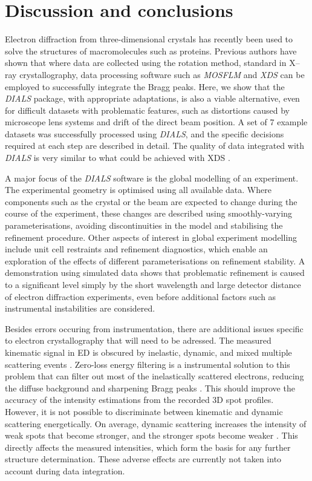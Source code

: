 \documentclass[preprint]{iucr}
\newcommand{\dials}{\emph{DIALS}\xspace}
\newcommand{\xds}{\emph{XDS}\xspace}
\newcommand{\mosflm}{\emph{MOSFLM}\xspace}
\begin{document}
\section{Discussion and conclusions}

Electron diffraction from three-dimensional crystals has recently been used to
solve the structures of macromolecules such as proteins. Previous authors have
shown that where data are collected using the rotation method, standard in
X--ray crystallography, data processing software such as \mosflm and
\xds can be employed to successfully integrate the Bragg peaks. Here, we show
that the \dials package, with appropriate adaptations, is also a viable
alternative, even for difficult datasets with problematic features, such as
distortions caused by microscope lens systems and drift of the direct beam
position. A set of 7 example datasets was successfully processed using \dials,
and the specific decisions required at each step are described in detail. The
quality of data integrated with \dials is very similar to what could be achieved
with XDS \cite{Clabbers2017}.

A major focus of the \dials software is the global modelling of an experiment.
The experimental geometry is optimised using all available data. Where
components such as the crystal or the beam are expected to change during the
course of the experiment, these changes are described using smoothly-varying
parameterisations, avoiding discontinuities in the model and stabilising the
refinement procedure. Other aspects of interest in global experiment modelling
include unit cell restraints and refinement diagnostics, which enable an
exploration of the effects of different parameterisations on refinement
stability. A demonstration using simulated data shows that problematic
refinement is caused to a significant level simply by the short wavelength and
large detector distance of electron diffraction experiments, even before
additional factors such as instrumental instabilities are considered.

Besides errors occuring from instrumentation, there are additional issues
specific to electron crystallography that will need to be adressed.
The measured kinematic signal in ED is obscured by inelastic, dynamic, and mixed
multiple scattering events \cite{dorset:1995,zou:2011,Clabbers2018}.
Zero-loss energy filtering is a instrumental
solution to this problem that can filter out most of the inelastically
scattered electrons, reducing the diffuse background and sharpening Bragg
peaks \cite{Yonekura2002}. This should improve the accuracy of the intensity
estimations from the recorded 3D spot profiles. However, it is not possible
to discriminate between kinematic and dynamic scattering energetically. On average,
dynamic scattering increases the intensity of weak spots that become stronger,
and the stronger spots become weaker \cite{Weirich2000}. This directly affects
the measured intensities, which form the basis for any further structure determination.
These adverse effects are currently not taken into account during data integration.
\end{document}
